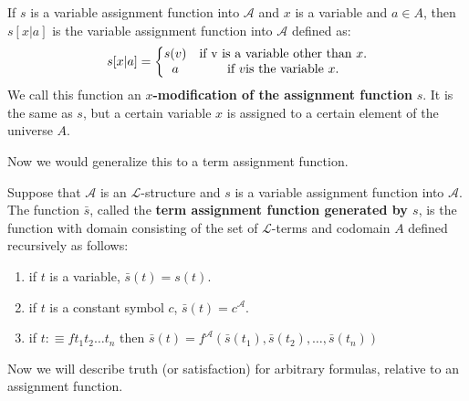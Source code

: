\documentclass[9pt,a4paper, twocolumn]{article}
\newcommand{\curveL}{\mathcal{L}}
\newcommand{\curveA}{\mathcal{A}}
\begin{document}
            \begin{define}
                If $s$ is a variable assignment function into $\curveA$ and $x$ is a variable and $a \in A$, then $s[x|a]$ is the variable assignment function into $\curveA$ defined as:
                \begin{equation}
                    s[x|a] = \left\{ \begin{matrix} s(v) & \text{if } $v$ \text{ is a variable other than } x.\\ a & \text{if } v \text{is the variable }x.\end{matrix}\right.
                \end{equation}
                We call this function an $x$\textbf{-modification of the assignment function} $s$. It is the same as $s$, but a certain variable $x$ is assigned to a certain element of the universe $A$.
            \end{define}
            Now we would generalize this to a term assignment function.
            \begin{define}
                Suppose that $\curveA$ is an $\curveL$-structure and $s$ is a variable assignment function into $\curveA$. The function $\bar s$, called the \textbf{term assignment function generated by $s$}, is the function with domain consisting of the set of $\curveL$-terms and codomain $A$ defined recursively as follows:
                \begin{enumerate}
                    \item if $t$ is a variable, $\bar s(t) = s(t)$.
                    \item if $t$ is a constant symbol $c$, $\bar s(t) = c^\curveA$.
                    \item if $t:\equiv ft_1t_2\dots t_n$ then $\bar s(t) = f^\curveA(\bar s(t_1),\bar s(t_2),\dots, \bar s(t_n))$
                \end{enumerate}
            \end{define}
            Now we will describe truth (or satisfaction) for arbitrary formulas, relative to an assignment function. 
\end{document}
